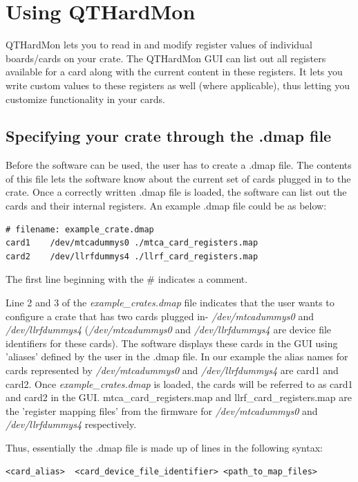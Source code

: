 \chapter{Using QTHardMon}

QTHardMon lets you to read in and modify register values of individual boards/cards on your crate. The QTHardMon GUI can list out all registers available for a card along with the current content in these registers. It lets you write custom values to these registers as well (where applicable), thus letting you customize functionality in your cards.

\section{Specifying your crate through the .dmap file}
Before the software can be used, the user has to create a .dmap file. The contents of this file lets the software know about the current set of cards plugged in to the crate. Once a correctly written .dmap file is loaded, the software can list out the cards and their internal registers. An example .dmap file could be as below:

\begin{lstlisting}
# filename: example_crate.dmap
card1    /dev/mtcadummys0 ./mtca_card_registers.map
card2    /dev/llrfdummys4 ./llrf_card_registers.map
\end{lstlisting}


The first line beginning with the \# indicates a comment. 

Line 2 and 3  of the \textit{example\_crates.dmap} file indicates that the user wants to configure a crate that has two cards plugged in- \textit{/dev/mtcadummys0} and \textit{/dev/llrfdummys4} (\textit{/dev/mtcadummys0} and \textit{/dev/llrfdummys4} are device file identifiers  for these cards). The software displays these cards in the GUI using 'aliases' defined by the user in the .dmap file. In our example the alias names for cards represented by \textit{/dev/mtcadummys0} and \textit{/dev/llrfdummys4} are card1 and card2. Once \textit{example\_crates.dmap} is loaded, the cards will be referred to as card1 and card2 in the GUI.
mtca\_card\_registers.map and llrf\_card\_registers.map are the 'register mapping files' from the firmware  for \textit{/dev/mtcadummys0} and \textit{/dev/llrfdummys4} respectively. 

Thus, essentially the .dmap file is made up of lines in the following syntax:
\begin{lstlisting}
<card_alias>  <card_device_file_identifier> <path_to_map_files>
\end{lstlisting}

